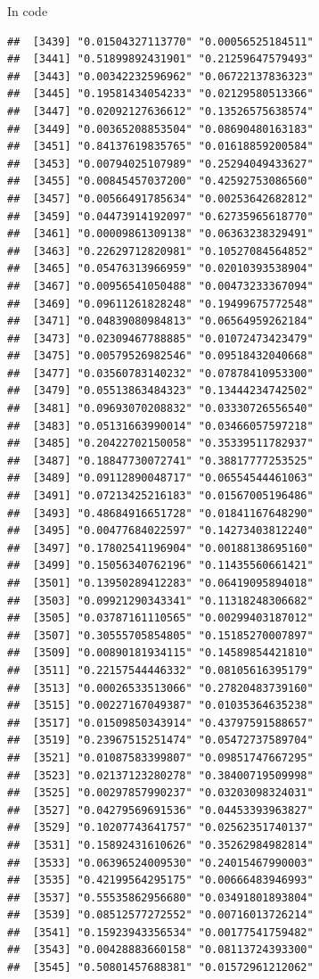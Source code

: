 \documentclass[ignorenonframetext,]{beamer}
\begin{document}
\begin{frame}[fragile]{In code}
\begin{verbatim}
##  [3439] "0.01504327113770" "0.00056525184511"
##  [3441] "0.51899892431901" "0.21259647579493"
##  [3443] "0.00342232596962" "0.06722137836323"
##  [3445] "0.19581434054233" "0.02129580513366"
##  [3447] "0.02092127636612" "0.13526575638574"
##  [3449] "0.00365208853504" "0.08690480163183"
##  [3451] "0.84137619835765" "0.01618859200584"
##  [3453] "0.00794025107989" "0.25294049433627"
##  [3455] "0.00845457037200" "0.42592753086560"
##  [3457] "0.00566491785634" "0.00253642682812"
##  [3459] "0.04473914192097" "0.62735965618770"
##  [3461] "0.00009861309138" "0.06363238329491"
##  [3463] "0.22629712820981" "0.10527084564852"
##  [3465] "0.05476313966959" "0.02010393538904"
##  [3467] "0.00956541050488" "0.00473233367094"
##  [3469] "0.09611261828248" "0.19499675772548"
##  [3471] "0.04839080984813" "0.06564959262184"
##  [3473] "0.02309467788885" "0.01072473423479"
##  [3475] "0.00579526982546" "0.09518432040668"
##  [3477] "0.03560783140232" "0.07878410953300"
##  [3479] "0.05513863484323" "0.13444234742502"
##  [3481] "0.09693070208832" "0.03330726556540"
##  [3483] "0.05131663990014" "0.03466057597218"
##  [3485] "0.20422702150058" "0.35339511782937"
##  [3487] "0.18847730072741" "0.38817777253525"
##  [3489] "0.09112890048717" "0.06554544461063"
##  [3491] "0.07213425216183" "0.01567005196486"
##  [3493] "0.48684916651728" "0.01841167648290"
##  [3495] "0.00477684022597" "0.14273403812240"
##  [3497] "0.17802541196904" "0.00188138695160"
##  [3499] "0.15056340762196" "0.11435560661421"
##  [3501] "0.13950289412283" "0.06419095894018"
##  [3503] "0.09921290343341" "0.11318248306682"
##  [3505] "0.03787161110565" "0.00299403187012"
##  [3507] "0.30555705854805" "0.15185270007897"
##  [3509] "0.00890181934115" "0.14589854421810"
##  [3511] "0.22157544446332" "0.08105616395179"
##  [3513] "0.00026533513066" "0.27820483739160"
##  [3515] "0.00227167049387" "0.01035364635238"
##  [3517] "0.01509850343914" "0.43797591588657"
##  [3519] "0.23967515251474" "0.05472737589704"
##  [3521] "0.01087583399807" "0.09851747667295"
##  [3523] "0.02137123280278" "0.38400719509998"
##  [3525] "0.00297857990237" "0.03203098324031"
##  [3527] "0.04279569691536" "0.04453393963827"
##  [3529] "0.10207743641757" "0.02562351740137"
##  [3531] "0.15892431610626" "0.35262984982814"
##  [3533] "0.06396524009530" "0.24015467990003"
##  [3535] "0.42199564295175" "0.00666483946993"
##  [3537] "0.55535862956680" "0.03491801893804"
##  [3539] "0.08512577272552" "0.00716013726214"
##  [3541] "0.15923943356534" "0.00177541759482"
##  [3543] "0.00428883660158" "0.08113724393300"
##  [3545] "0.50801457688381" "0.01572961212062"

\end{verbatim}
\end{frame}
\end{document}

